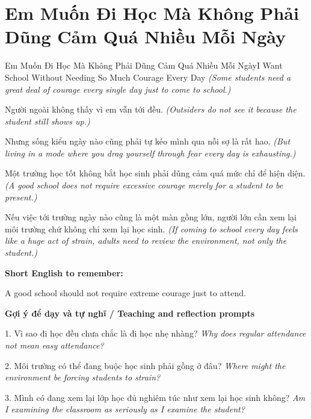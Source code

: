 \section{Em Muốn Đi Học Mà Không Phải Dũng Cảm Quá Nhiều Mỗi Ngày}
\begin{truyen}{Em Muốn Đi Học Mà Không Phải Dũng Cảm Quá Nhiều Mỗi Ngày}{I Want School Without Needing So Much Courage Every Day}
\textit{(Some students need a great deal of courage every single day just to come to school.)}

Người ngoài không thấy vì em vẫn tới đều.
\textit{(Outsiders do not see it because the student still shows up.)}

Nhưng sống kiểu ngày nào cũng phải tự kéo mình qua nỗi sợ là rất hao.
\textit{(But living in a mode where you drag yourself through fear every day is exhausting.)}

Một trường học tốt không bắt học sinh phải dũng cảm quá mức chỉ để hiện diện.
\textit{(A good school does not require excessive courage merely for a student to be present.)}

\end{truyen}

\begin{baihoc}
Nếu việc tới trường ngày nào cũng là một màn gồng lớn, người lớn cần xem lại môi trường chứ không chỉ xem lại học sinh.
\textit{(If coming to school every day feels like a huge act of strain, adults need to review the environment, not only the student.)}
\end{baihoc}

\begin{ghinhoanh}
\textbf{Short English to remember:}

A good school should not require extreme courage just to attend.

\end{ghinhoanh}

\begin{tuhocnhanh}
\textbf{Gợi ý để dạy và tự nghĩ / Teaching and reflection prompts}

1. Vì sao đi học đều chưa chắc là đi học nhẹ nhàng? \textit{Why does regular attendance not mean easy attendance?}

2. Môi trường có thể đang buộc học sinh phải gồng ở đâu? \textit{Where might the environment be forcing students to strain?}

3. Mình có đang xem lại lớp học đủ nghiêm túc như xem lại học sinh không? \textit{Am I examining the classroom as seriously as I examine the student?}
\end{tuhocnhanh}
